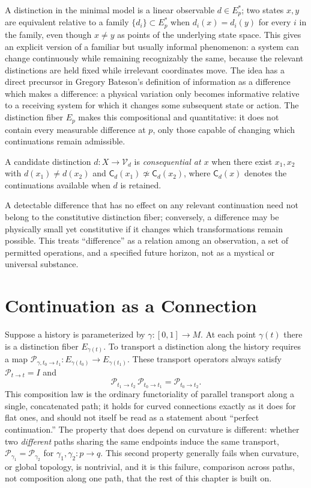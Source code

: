 A distinction in the minimal model is a linear observable $d \in E_p^\ast$; two states $x,y$ are equivalent relative to a family $\{d_i\} \subset E_p^\ast$ when $d_i(x) = d_i(y)$ for every $i$ in the family, even though $x \neq y$ as points of the underlying state space. This gives an explicit version of a familiar but usually informal phenomenon: a system can change continuously while remaining recognizably the same, because the relevant distinctions are held fixed while irrelevant coordinates move. The idea has a direct precursor in Gregory Bateson's definition of information as a difference which makes a difference: a physical variation only becomes informative relative to a receiving system for which it changes some subsequent state or action. The distinction fiber $E_p$ makes this compositional and quantitative: it does not contain every measurable difference at $p$, only those capable of changing which continuations remain admissible.

\begin{definition}
A candidate distinction $d : X \to \mathcal{V}_d$ is \emph{consequential at $x$} when there exist $x_1, x_2$ with $d(x_1) \neq d(x_2)$ and $\mathsf{C}_d(x_1) \not\simeq \mathsf{C}_d(x_2)$, where $\mathsf{C}_d(x)$ denotes the continuations available when $d$ is retained.
\end{definition}

A detectable difference that has no effect on any relevant continuation need not belong to the constitutive distinction fiber; conversely, a difference may be physically small yet constitutive if it changes which transformations remain possible. This treats ``difference'' as a relation among an observation, a set of permitted operations, and a specified future horizon, not as a mystical or universal substance.

\section{Continuation as a Connection}

Suppose a history is parameterized by $\gamma : [0,1] \to M$. At each point $\gamma(t)$ there is a distinction fiber $E_{\gamma(t)}$. To transport a distinction along the history requires a map $\mathcal{P}_{\gamma,t_0\to t_1} : E_{\gamma(t_0)} \to E_{\gamma(t_1)}$. These transport operators always satisfy $\mathcal{P}_{t\to t} = I$ and
\[
\mathcal{P}_{t_1 \to t_2}\, \mathcal{P}_{t_0 \to t_1} = \mathcal{P}_{t_0 \to t_2}.
\]
This composition law is the ordinary functoriality of parallel transport along a single, concatenated path; it holds for curved connections exactly as it does for flat ones, and should not itself be read as a statement about ``perfect continuation.'' The property that does depend on curvature is different: whether two \emph{different} paths sharing the same endpoints induce the same transport, $\mathcal{P}_{\gamma_1} = \mathcal{P}_{\gamma_2}$ for $\gamma_1, \gamma_2 : p \to q$. This second property generally fails when curvature, or global topology, is nontrivial, and it is this failure, comparison across paths, not composition along one path, that the rest of this chapter is built on.

